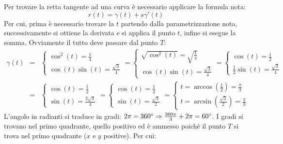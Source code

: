 \documentclass[a4paper]{article}
\begin{document}
	\noindent
	Per trovare la retta tangente ad una curva è necessario applicare la formula nota:
	\begin{equation*}
		r\left(t\right) = \gamma\left(t\right) + s\gamma'\left(t\right)
	\end{equation*}
	Per cui, prima è necessario trovare la $t$ partendo dalla parametrizzazione nota, successivamente si ottiene la derivata e si applica il punto $t$, infine si esegue la somma. Ovviamente il tutto deve passare dal punto $T$:
	\begin{equation*}
		\begin{array}{rcl}
			\gamma\left(t\right) &=& \begin{cases}
				\cos^{2}\left(t\right) = \frac{1}{4} \\
				\cos\left(t\right) \sin\left(t\right) = \frac{\sqrt{3}}{4}
			\end{cases}
			=
			\begin{cases}
				\sqrt{\cos^{2}\left(t\right)} = \sqrt{\frac{1}{4}} \\
				\cos\left(t\right) \sin\left(t\right) = \frac{\sqrt{3}}{4}
			\end{cases}
			=
			\begin{cases}
				\cos\left(t\right) = \frac{1}{2} \\
				\frac{1}{2} \sin\left(t\right) = \frac{\sqrt{3}}{4}
			\end{cases} \\ [2em]
			&=&
			\begin{cases}
				\cos\left(t\right) = \frac{1}{2} \\
				\sin\left(t\right) = \frac{2\sqrt{3}}{4}
			\end{cases}
			=
			\begin{cases}
				\cos\left(t\right) = \frac{1}{2} \\
				\sin\left(t\right) = \frac{\sqrt{3}}{2}
			\end{cases}
			=
			\begin{cases}
				t=\arccos\left(\frac{1}{2}\right) = \frac{\pi}{3} \\
				t=\arcsin\left(\frac{\sqrt{3}}{2}\right) = \frac{\pi}{3}
			\end{cases}
		\end{array}
	\end{equation*}
	L'angolo in radianti si traduce in gradi: $2\pi = 360\degree \Rightarrow \frac{360 \pi}{3}\div 2\pi = 60\degree$. I gradi si trovano nel primo quadrante, quello positivo ed è ammesso poiché il punto $T$ si trova nel primo quadrante ($x$ e $y$ positive). Per cui:
\end{document}
